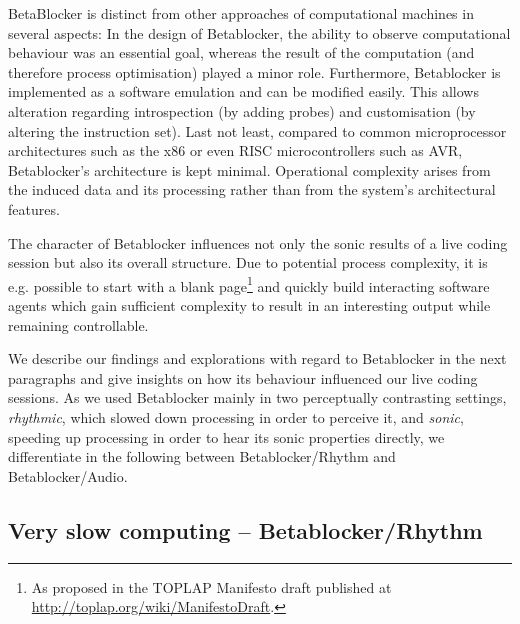 \documentclass[letterpaper, 12pt]{article}
\begin{document}

BetaBlocker is distinct from other approaches of computational machines in several aspects:
In the design of Betablocker, the ability to observe computational behaviour was an essential goal, whereas the result of the computation (and therefore process optimisation) played a minor role.
Furthermore, Betablocker is implemented as a software emulation and can be modified easily.
This allows alteration regarding introspection (by adding probes) and customisation (by altering the instruction set).
Last not least, compared to common microprocessor architectures such as the x86 \citep{alpert1993-arc}
or even RISC microcontrollers \citep{kane1988-mip} such as AVR, Betablocker's architecture is kept minimal.
Operational complexity arises from the induced data and its processing rather than from the system's architectural features.

The character of Betablocker influences not only the sonic results of a live coding session but also its overall structure.
Due to potential process complexity, it is e.g. possible to start with a blank page\footnote{As proposed in the TOPLAP Manifesto draft published at \url{http://toplap.org/wiki/ManifestoDraft}.}
and quickly build interacting software agents which gain sufficient complexity to result in an interesting output while remaining controllable.

We describe our findings and explorations with regard to Betablocker in the next paragraphs and give insights on how its behaviour influenced our live coding sessions.
As we used Betablocker mainly in two perceptually contrasting settings, \emph{rhythmic}, which slowed down processing in order to perceive it, and \emph{sonic}, speeding up processing in order to hear its sonic properties directly, we differentiate in the following between Betablocker/Rhythm and Betablocker/Audio.
\parskip 18pt

\subsection{Very slow computing -- Betablocker/Rhythm}
\label{sub:slow_computing}
\end{document}
